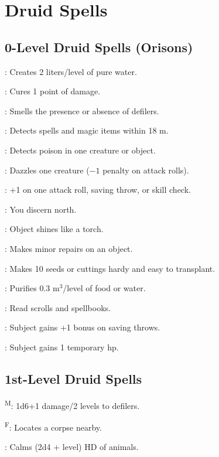 \section{Druid Spells}



\subsection{0-Level Druid Spells (Orisons)}

: Creates 2 liters/level of pure water.

: Cures 1 point of damage.

: Smells the presence or absence of defilers.

: Detects spells and magic items within 18 m.

: Detects poison in one creature or object.

: Dazzles one creature ($-1$ penalty on attack rolls).

: +1 on one attack roll, saving throw, or skill check.

: You discern north.

: Object shines like a torch.

: Makes minor repairs on an object.

: Makes 10 seeds or cuttings hardy and easy to transplant.

: Purifies 0.3 m$^3$/level of food or water.

: Read scrolls and spellbooks.

: Subject gains +1 bonus on saving throws.

: Subject gains 1 temporary hp.



\subsection{1st-Level Druid Spells}

\textsuperscript{M}: 1d6+1 damage/2 levels to defilers.

\textsuperscript{F}: Locates a corpse nearby.

: Calms (2d4 + level) HD of animals.

